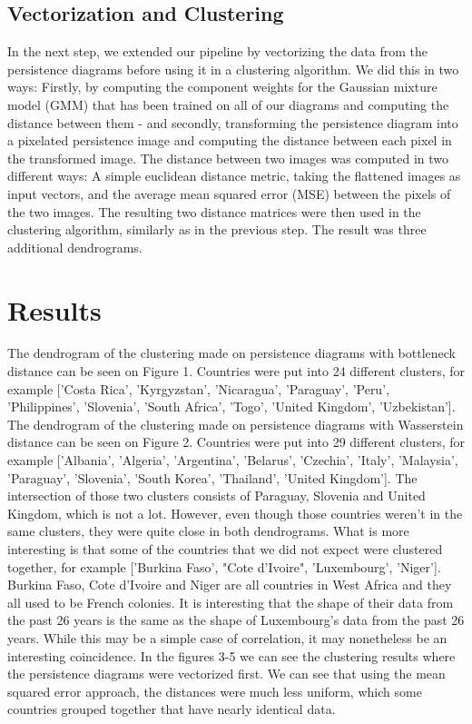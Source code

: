 \documentclass[12pt]{article}
\begin{document}
\subsection{Vectorization and Clustering}
In the next step, we extended our pipeline by vectorizing the data from the persistence diagrams before using it in a clustering algorithm. We did this in two ways: Firstly, by computing the component weights for the Gaussian mixture model (GMM) that has been trained on all of our diagrams and computing the distance between them - and secondly, transforming the persistence diagram into a pixelated persistence image and computing the distance between each pixel in the transformed image. The distance between two images was computed in two different ways: A simple euclidean distance metric, taking the flattened images as input vectors, and the average mean squared error (MSE) between the pixels of the two images. The resulting two distance matrices were then used in the clustering algorithm, similarly as in the previous step. The result was three additional dendrograms.

\section{Results}
The dendrogram of the clustering made on persistence diagrams with bottleneck distance can be seen on Figure 1. Countries were put into 24 different clusters, for example ['Costa Rica', 'Kyrgyzstan', 'Nicaragua', 'Paraguay', 'Peru', 'Philippines', 'Slovenia', 'South Africa', 'Togo', 'United Kingdom', 'Uzbekistan']. The dendrogram of the clustering made on persistence diagrams with Wasserstein distance can be seen on Figure 2. Countries were put into 29 different clusters, for example ['Albania', 'Algeria', 'Argentina', 'Belarus', 'Czechia', 'Italy', 'Malaysia', 'Paraguay', 'Slovenia', 'South Korea', 'Thailand', 'United Kingdom']. The intersection of those two clusters consists of  Paraguay, Slovenia and United Kingdom, which is not a lot. However, even though those countries weren't in the same clusters, they were quite close in both dendrograms. What is more interesting
is that some of the countries that we did not expect were clustered together, for example ['Burkina Faso', "Cote d'Ivoire", 'Luxembourg', 'Niger']. Burkina Faso, Cote d'Ivoire and Niger are all countries in West Africa and they all used to be French colonies. It is interesting that the shape of their data from the past 26 years is the same as the shape of Luxembourg's data from the past 26 years. While this may be a simple case of correlation, it may nonetheless be an interesting coincidence.
In the figures 3-5 we can see the clustering results where the persistence diagrams were vectorized first. We can see that using the mean squared error approach, the distances were much less uniform, which some countries grouped together that have nearly identical data.
\end{document}
